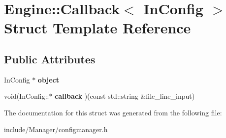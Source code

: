 \hypertarget{structEngine_1_1Callback}{}\section{Engine\+:\+:Callback$<$ In\+Config $>$ Struct Template Reference}
\label{structEngine_1_1Callback}
\subsection*{Public Attributes}
\begin{DoxyCompactItemize}
\item 
\hypertarget{structEngine_1_1Callback_a3c1a0b2c0e1f5ae4c0f17d19831a9417}{}In\+Config $\ast$ {\bfseries object}\label{structEngine_1_1Callback_a3c1a0b2c0e1f5ae4c0f17d19831a9417}

\item 
\hypertarget{structEngine_1_1Callback_a7c2b354fdc1a15d9b9d21696533c704d}{}void(In\+Config\+::$\ast$ {\bfseries callback} )(const std\+::string \&file\+\_\+line\+\_\+input)\label{structEngine_1_1Callback_a7c2b354fdc1a15d9b9d21696533c704d}

\end{DoxyCompactItemize}


The documentation for this struct was generated from the following file\+:\begin{DoxyCompactItemize}
\item 
include/\+Manager/configmanager.\+h\end{DoxyCompactItemize}

